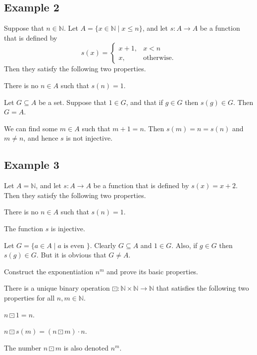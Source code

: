 \subsection*{Example 2}
Suppose that $n \in \mathbb{N}$. Let $A = \{ x \in \mathbb{N} \mid x \leq n \}$, and let $s: A \to A$ be a function that is defined by
$$
	s(x) = \begin{cases}
		x + 1, & x < n            \\
		x,     & \text{otherwise}.
	\end{cases}
$$
Then they satisfy the following two properties.
\begin{lenumerate}
	\item There is no $n \in A$ such that $s(n) = 1$.
	\item Let $G \subseteq A$ be a set. Suppose that $1 \in G$, and that if $g \in G$ then $s(g) \in G$. Then
	      $G = A$.
\end{lenumerate}
We can find some $m \in A$ such that $m + 1 = n$. Then $s(m) = n = s(n)$ and $m \not= n$, and hence $s$ is not injective.

\subsection*{Example 3}
Let $A = \mathbb{N}$, and let $s: A \to A$ be a function that is defined by $s(x) = x + 2$. Then they satisfy the following two properties.
\begin{lenumerate}
	\item There is no $n \in A$ such that $s(n) = 1$.
	\item The function $s$ is injective.
\end{lenumerate}
Let $G = \{ a \in A \mid  a \text{ is even } \}$. Clearly $G \subseteq A$ and $1 \in G$. Also, if $g \in G$ then $s(g) \in G$. But it is obvious that $G \not= A$.


\Newpage
\begin{exercise} %
	Construct the exponentiation $n^m$ and prove its basic properties.
\end{exercise}

\begin{theorem}[Exponentiation]
	\label{nat:t:exp}
	There is a unique binary operation $\boxdot: \mathbb{N} \times \mathbb{N} \to \mathbb{N}$ that satisfies the following two properties for all $n, m \in \mathbb{N}$.
	\begin{lenumerate}
		\item \label{nat:t:exp:1}
		      $n \boxdot 1 = n$.
		\item \label{nat:t:exp:n}
		      $n \boxdot s(m) = (n \boxdot m) \cdot n$.
	\end{lenumerate}
	The number $n \boxdot m$ is also denoted $n^m$.
\end{theorem}

